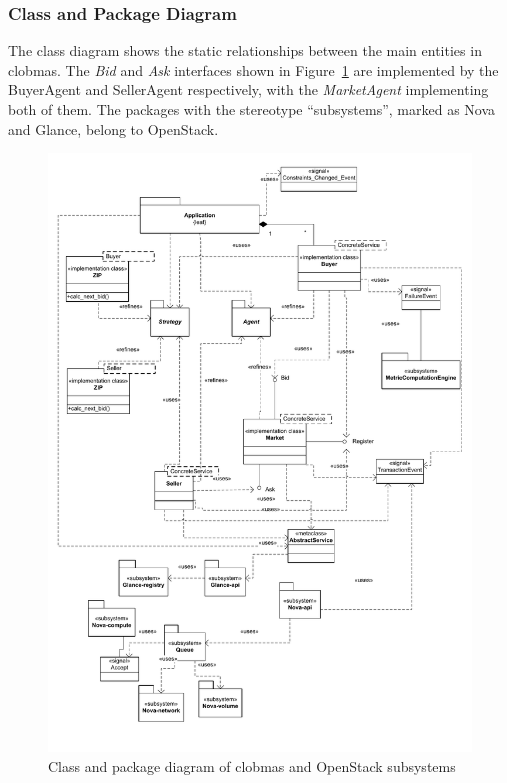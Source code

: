 \documentclass[10pt,journal,compsoc]{IEEEtran}
\begin{document}
\subsubsection{Class and Package Diagram} The class diagram shows the static relationships between the main entities in clobmas. The \textit{Bid} and \textit{Ask} interfaces shown in Figure~\ref{fig:package_diagram} are implemented by the BuyerAgent and SellerAgent respectively, with the \textit{MarketAgent} implementing both of them. The packages with the stereotype ``subsystems'', marked as Nova and Glance, belong to OpenStack.


\begin{figure}[htbp]
\centering
\includegraphics[scale=0.75]{drawings/class_and_package_diagram.pdf}
\caption{Class and package diagram of clobmas and OpenStack subsystems\label{fig:package_diagram}}
\end{figure}
\end{document}
